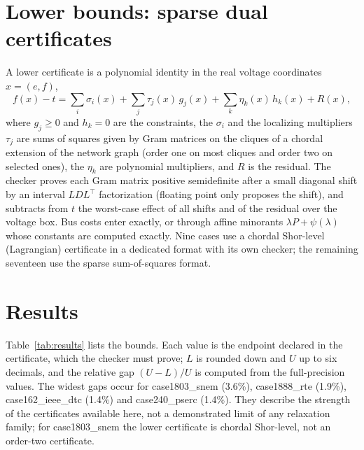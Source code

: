 \documentclass[10pt]{article}
\begin{document}
\section{Lower bounds: sparse dual certificates}
A lower certificate is a polynomial identity in the real voltage coordinates $x=(e,f)$,
\begin{equation}
f(x)-t=\sum_i \sigma_i(x)+\sum_j \tau_j(x)\,g_j(x)+\sum_k \eta_k(x)\,h_k(x)+R(x),
\end{equation}
where $g_j\ge 0$ and $h_k=0$ are the constraints, the $\sigma_i$ and the localizing multipliers $\tau_j$ are sums of squares
given by Gram matrices on the cliques of a chordal extension of the network graph (order one on most cliques and order two
on selected ones), the $\eta_k$ are polynomial multipliers, and $R$ is the residual. The checker proves each Gram matrix
positive semidefinite after a small diagonal shift by an interval $LDL^\top$ factorization (floating point only proposes the
shift), and subtracts from $t$ the worst-case effect of all shifts and of the residual over the voltage box. Bus costs
enter exactly, or through affine minorants $\lambda P+\psi(\lambda)$ whose constants are computed exactly. Nine cases use a chordal Shor-level (Lagrangian) certificate in a
dedicated format with its own checker; the remaining seventeen use the sparse sum-of-squares format.

\section{Results}
Table~\ref{tab:results} lists the bounds. Each value is the endpoint declared in the certificate, which the checker must
prove; $L$ is rounded down and $U$ up to six decimals, and the relative gap $(U-L)/U$ is computed from the full-precision
values. The widest gaps occur for case1803\_snem (3.6\%), case1888\_rte (1.9\%), case162\_ieee\_dtc
(1.4\%) and case240\_pserc (1.4\%). They describe the strength of the certificates available here, not a demonstrated limit
of any relaxation family; for case1803\_snem the lower certificate is chordal Shor-level, not an order-two certificate.

{\small}
\end{document}
